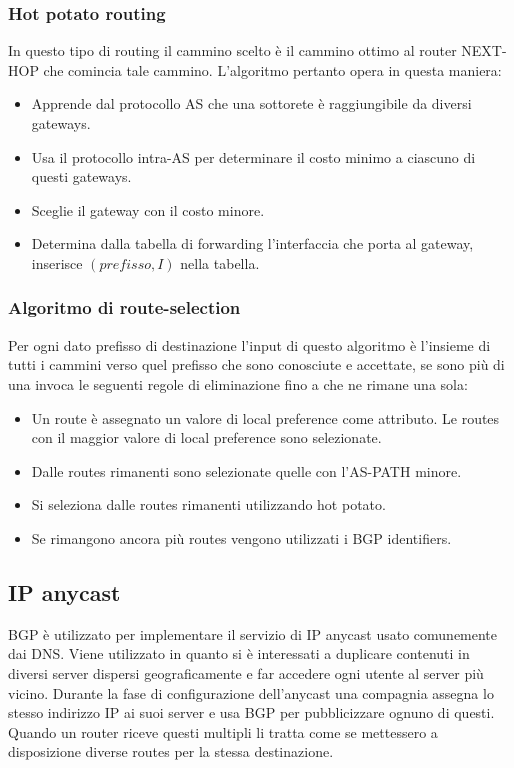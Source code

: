 \subsubsection{Hot potato routing}
In questo tipo di routing il cammino scelto \`e il cammino ottimo al router NEXT-HOP che comincia tale cammino. L'algoritmo pertanto opera in questa 
maniera:
\begin{itemize}
\item Apprende dal protocollo AS che una sottorete \`e raggiungibile da diversi gateways.
\item Usa il protocollo intra-AS per determinare il costo minimo a ciascuno di questi gateways.
\item Sceglie il gateway con il costo minore.
\item Determina dalla tabella di forwarding l'interfaccia che porta al gateway, inserisce $(prefisso, I)$ nella tabella. 
\end{itemize}
\subsubsection{Algoritmo di route-selection}
Per ogni dato prefisso di destinazione l'input di questo algoritmo \`e l'insieme di tutti i cammini verso quel prefisso che sono conosciute e accettate, se 
sono pi\`u di una invoca le seguenti regole di eliminazione fino a che ne rimane una sola:
\begin{itemize}
\item Un route \`e assegnato un valore di local preference come attributo. Le routes con il maggior valore di local preference sono selezionate.
\item Dalle routes rimanenti sono selezionate quelle con l'AS-PATH minore. 
\item Si seleziona dalle routes rimanenti utilizzando hot potato.
\item Se rimangono ancora pi\`u routes vengono utilizzati i BGP identifiers. 
\end{itemize}
\subsection{IP anycast}
BGP \`e utilizzato per implementare il servizio di IP anycast usato comunemente dai DNS. Viene utilizzato in quanto si \`e interessati a duplicare contenuti
in diversi server dispersi geograficamente e far accedere ogni utente al server pi\`u vicino. Durante la fase di configurazione dell'anycast una compagnia
assegna lo stesso indirizzo IP ai suoi server e usa BGP per pubblicizzare ognuno di questi. Quando un router riceve questi multipli li tratta come se 
mettessero a disposizione diverse routes per la stessa destinazione. 
